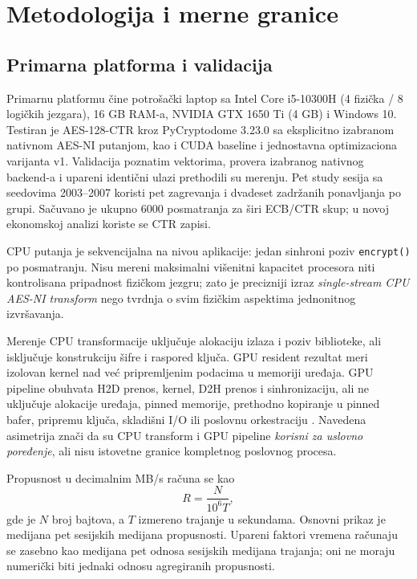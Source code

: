 \documentclass[11pt,b5paper]{article}
\begin{document}
\section{Metodologija i merne granice}
\subsection{Primarna platforma i validacija}
Primarnu platformu čine potrošački laptop sa Intel Core i5-10300H (4 fizička / 8 logičkih jezgara), 16 GB RAM-a, NVIDIA GTX 1650 Ti (4 GB) i Windows 10. Testiran je AES-128-CTR kroz PyCryptodome 3.23.0 sa eksplicitno izabranom nativnom AES-NI putanjom, kao i CUDA baseline i jednostavna optimizaciona varijanta v1. Validacija poznatim vektorima, provera izabranog nativnog backend-a i upareni identični ulazi prethodili su merenju. Pet study sesija sa seedovima 2003--2007 koristi pet zagrevanja i dvadeset zadržanih ponavljanja po grupi. Sačuvano je ukupno 6000 posmatranja za širi ECB/CTR skup; u novoj ekonomskoj analizi koriste se CTR zapisi.\par
CPU putanja je sekvencijalna na nivou aplikacije: jedan sinhroni poziv \texttt{encrypt()} po posmatranju. Nisu mereni maksimalni višenitni kapacitet procesora niti kontrolisana pripadnost fizičkom jezgru; zato je precizniji izraz \emph{single-stream CPU AES-NI transform} nego tvrdnja o svim fizičkim aspektima jednonitnog izvršavanja.\par
Merenje CPU transformacije uključuje alokaciju izlaza i poziv biblioteke, ali isključuje konstrukciju šifre i raspored ključa. GPU resident rezultat meri izolovan kernel nad već pripremljenim podacima u memoriji uređaja. GPU pipeline obuhvata H2D prenos, kernel, D2H prenos i sinhronizaciju, ali ne uključuje alokacije uređaja, pinned memorije, prethodno kopiranje u pinned bafer, pripremu ključa, skladišni I/O ili poslovnu orkestraciju \citep{nvidia_guide}. Navedena asimetrija znači da su CPU transform i GPU pipeline \emph{korisni za uslovno poređenje}, ali nisu istovetne granice kompletnog poslovnog procesa.\par
Propusnost u decimalnim MB/s računa se kao
\begin{equation}\label{eq:rate}R=\frac{N}{10^6T},\end{equation}
gde je $N$ broj bajtova, a $T$ izmereno trajanje u sekundama. Osnovni prikaz je medijana pet sesijskih medijana propusnosti. Upareni faktori vremena računaju se zasebno kao medijana pet odnosa sesijskih medijana trajanja; oni ne moraju numerički biti jednaki odnosu agregiranih propusnosti.
\end{document}
